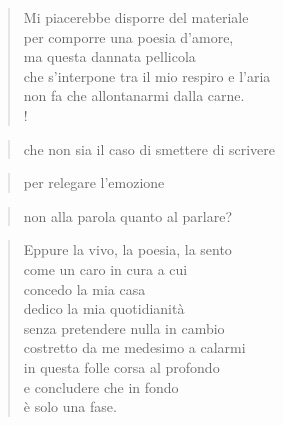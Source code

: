
\begin{verse}
    Mi piacerebbe disporre del materiale\\
    per comporre una poesia d'amore,\\
    ma questa dannata pellicola\\
    che s'interpone tra il mio respiro e l'aria\\
    non fa che allontanarmi dalla carne.\\!
\end{verse}

\begin{verse}
    \hfill che non sia il caso di smettere di scrivere
\end{verse}
\vspace{-0.9cm}
\begin{verse}
    \hfill per relegare l'emozione
\end{verse}
\vspace{-0.9cm}
\begin{verse}
    \hfill non alla parola quanto al parlare?
\end{verse}

\begin{verse}
    Eppure la vivo, la poesia, la sento\\
    come un caro in cura a cui\\
    concedo la mia casa\\
    dedico la mia quotidianità\\
    senza pretendere nulla in cambio\\
    costretto da me medesimo a calarmi\\
    in questa folle corsa al profondo\\
    e concludere che in fondo\\
    è solo una fase.
\end{verse}